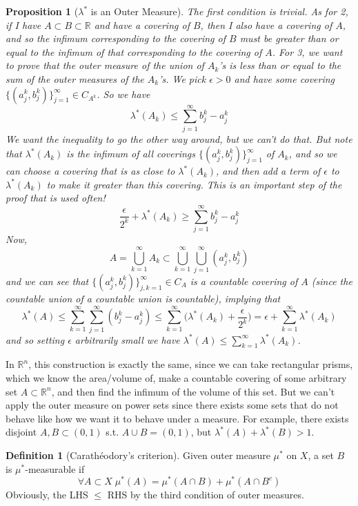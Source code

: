 \documentclass{article}
\newtheorem{proposition}[theorem]{Proposition}
\theoremstyle{remark}
\theoremstyle{definition}
\newtheorem{definition}{Definition}[section]
\begin{document}
\begin{proposition}[$\lambda^*$ is an Outer Measure]
The first condition is trivial. As for 2, if I have $A \subset B \subset \mathbb{R}$ and have a covering of $B$, then I also have a covering of $A$, and so the infimum corresponding to the covering of $B$ must be greater than or equal to the infimum of that corresponding to the covering of $A$. For 3, we want to prove that the outer measure of the union of $A_k$'s is less than or equal to the sum of the outer measures of the $A_k$'s. We pick $\epsilon > 0$ and have some covering $\{(a^k_j, b^k_j)\}_{j=1}^\infty \in C_{A^k}$. So we have 
\[\lambda^*(A_k) \leq \sum_{j=1}^\infty b^k_j - a^k_j\]
We want the inequality to go the other way around, but we can't do that. But note that $\lambda^* (A_k)$ is the infimum of all coverings $\{(a^k_j, b^k_j)\}_{j=1}^\infty$ of $A_k$, and so we can choose a covering that is as close to $\lambda^* (A_k)$, and then add a term of $\epsilon$ to $\lambda^*(A_k)$ to make it greater than this covering. This is an important step of the proof that is used often! 
\[\frac{\epsilon}{2^k} + \lambda^* (A_k) \geq \sum_{j=1}^\infty b_j^k - a_j^k \]
Now, 
\[A = \bigcup_{k=1}^\infty A_k \subset \bigcup_{k=1}^\infty \bigcup_{j=1}^\infty (a_j^k, b_j^k)\]
and we can see that $\{(a_j^k , b_j^k)\}_{j, k=1}^\infty \in C_A$ is a countable covering of $A$ (since the countable union of a countable union is countable), implying that 
\[\lambda^* (A) \leq \sum_{k=1}^\infty \sum_{j=1}^\infty (b_j^k - a_j^k) \leq \sum_{k=1}^\infty \bigg( \lambda^* (A_k) + \frac{\epsilon}{2^k} \bigg) = \epsilon + \sum_{k=1}^\infty \lambda^*(A_k)\]
and so setting $\epsilon$ arbitrarily small we have $\lambda^* (A) \leq \sum_{k=1}^\infty \lambda^* (A_k)$. 
\end{proposition}

In $\mathbb{R}^n$, this construction is exactly the same, since we can take rectangular prisms, which we know the area/volume of, make a countable covering of some arbitrary set $A \subset \mathbb{R}^n$, and then find the infimum of the volume of this set. But we can't apply the outer measure on power sets since there exists some sets that do not behave like how we want it to behave under a measure. For example, there exists disjoint $A, B \subset (0, 1)$ s.t. $A \cup B = (0, 1)$, but $\lambda^*(A) + \lambda^*(B) > 1$. 

\begin{definition}[Carathéodory's criterion]
Given outer measure $\mu^*$ on $X$, a set $B$ is $\mu^*$-measurable if 
\[\forall A \subset X \; \mu^*(A) = \mu^*(A \cap B) + \mu^*(A \cap B^c)\]
Obviously, the LHS $\leq$ RHS by the third condition of outer measures. 
\end{definition}
\end{document}
